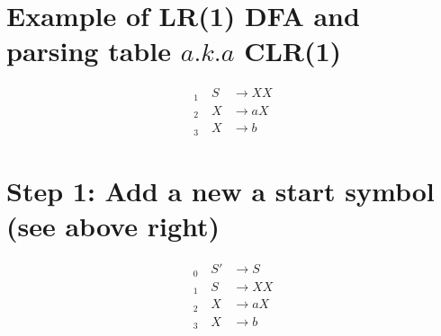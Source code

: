 \section*{Example of LR(1) DFA and parsing table $a.k.a$ CLR(1)}
\begin{align*}
  _1\quad S&\to XX \\
  _2\quad X&\to aX \\
  _3\quad X&\to b
\end{align*}
\section*{Step 1: Add a new a start symbol (see above right)}
\begin{align*}
  _0\quad S'&\to S \\
  _1\quad S&\to XX \\
  _2\quad X&\to aX \\
  _3\quad X&\to b
\end{align*}
